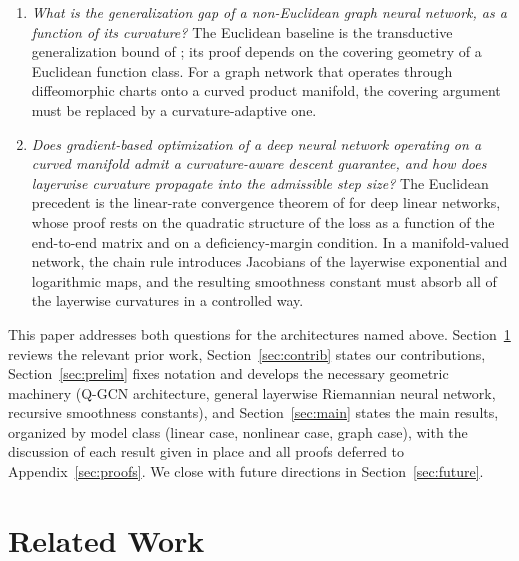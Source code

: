\documentclass[letterpaper]{article}
\begin{document}
\begin{enumerate}[label=(\roman*), leftmargin=2.2em]
\item \emph{What is the generalization gap of a non-Euclidean graph neural
network, as a function of its curvature?} The Euclidean baseline is the
transductive generalization bound of \cite{tang2023towards}; its proof
depends on the covering geometry of a Euclidean function class. For a graph
network that operates through diffeomorphic charts onto a curved product
manifold, the covering argument must be replaced by a curvature-adaptive
one.

\item \emph{Does gradient-based optimization of a deep neural network
operating on a curved manifold admit a curvature-aware descent guarantee,
and how does layerwise curvature propagate into the admissible step
size?} The Euclidean precedent is the linear-rate convergence theorem of
\cite{arora2018convergence} for deep linear networks, whose proof rests on
the quadratic structure of the loss as a function of the end-to-end matrix
and on a deficiency-margin condition. In a manifold-valued network, the
chain rule introduces Jacobians of the layerwise exponential and
logarithmic maps, and the resulting smoothness constant must absorb all of
the layerwise curvatures in a controlled way.
\end{enumerate}

This paper addresses both questions for the architectures named above.
Section~\ref{sec:relwork} reviews the relevant prior work,
Section~\ref{sec:contrib} states our contributions,
Section~\ref{sec:prelim} fixes notation and develops the necessary
geometric machinery (Q-GCN architecture, general layerwise Riemannian
neural network, recursive smoothness constants), and
Section~\ref{sec:main} states the main results, organized by model
class (linear case, nonlinear case, graph case), with the discussion of
each result given in place and all proofs deferred to
Appendix~\ref{sec:proofs}. We close with future directions in
Section~\ref{sec:future}.

\section{Related Work}
\label{sec:relwork}
\end{document}
